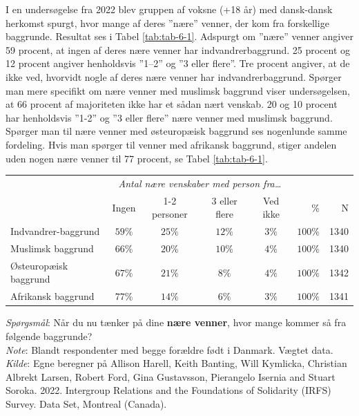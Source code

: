 \documentclass[
]{book}
\begin{document}
I en undersøgelse fra 2022 blev gruppen af voksne (+18 år) med dansk-dansk herkomst spurgt, hvor mange af deres ''nære'' venner, der kom fra forskellige baggrunde. Resultat ses i Tabel \ref{tab:tab-6-1}. Adspurgt om ''nære'' venner angiver 59 procent, at ingen af deres nære venner har indvandrerbaggrund. 25 procent og 12 procent angiver henholdsvis ''1--2'' og ''3 eller flere''. Tre procent angiver, at de ikke ved, hvorvidt nogle af deres nære venner har indvandrerbaggrund. Spørger man mere specifikt om nære venner med muslimsk baggrund viser undersøgelsen, at 66 procent af majoriteten ikke har et sådan nært venskab. 20 og 10 procent har henholdsvis ''1-2'' og ''3 eller flere'' nære venner med muslimsk baggrund. Spørger man til nære venner med østeuropæisk baggrund ses nogenlunde samme fordeling. Hvis man spørger til venner med afrikansk baggrund, stiger andelen uden nogen nære venner til 77 procent, se Tabel \ref{tab:tab-6-1}.

\setlength{\LTpost}{0mm}
\begin{longtable}{l|ccccrr}
\toprule
\multicolumn{1}{l}{} & \multicolumn{4}{c}{\emph{Antal nære venskaber med person fra\ldots{}}} &  &  \\ 
\cmidrule(lr){2-5}
\multicolumn{1}{l}{} & Ingen & 1-2 personer & 3 eller flere & Ved ikke & \% & N \\ 
\midrule\addlinespace[2.5pt]
Indvandrer-baggrund & $59\%$ & $25\%$ & $12\%$ & $3\%$ & $100\%$ & 1340 \\ 
Muslimsk baggrund & $66\%$ & $20\%$ & $10\%$ & $4\%$ & $100\%$ & 1340 \\ 
Østeuropæisk baggrund & $67\%$ & $21\%$ & $8\%$ & $4\%$ & $100\%$ & 1342 \\ 
Afrikansk baggrund & $77\%$ & $14\%$ & $6\%$ & $3\%$ & $100\%$ & 1341 \\ 
\bottomrule
\end{longtable}
\begin{minipage}{\linewidth}
\emph{Spørgsmål}: Når du nu tænker på dine \textbf{nære venner}, hvor mange kommer så fra følgende baggrunde?\\
\emph{Note}: Blandt respondenter med begge forældre født i Danmark. Vægtet data.\\
\emph{Kilde}: Egne beregner på Allison Harell, Keith Banting, Will Kymlicka, Christian Albrekt Larsen, Robert Ford, Gina Gustavsson, Pierangelo Isernia and Stuart Soroka. 2022. Intergroup Relations and the Foundations of Solidarity (IRFS) Survey. Data Set, Montreal (Canada).\\
\end{minipage}
\end{document}
